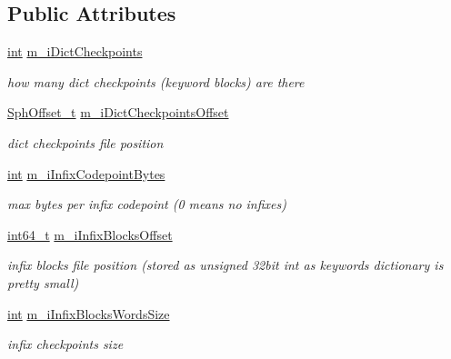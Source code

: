 \subsection*{Public Attributes}
\begin{DoxyCompactItemize}
\item 
\hyperlink{sphinxexpr_8cpp_a4a26e8f9cb8b736e0c4cbf4d16de985e}{int} \hyperlink{structDictHeader__t_affafa311bfd3aaf2dc4e458868faf186}{m\-\_\-i\-Dict\-Checkpoints}
\begin{DoxyCompactList}\small\item\em how many dict checkpoints (keyword blocks) are there \end{DoxyCompactList}\item 
\hyperlink{sphinx_8h_a0fb3b64afebef33c61367714754eaa90}{Sph\-Offset\-\_\-t} \hyperlink{structDictHeader__t_ae436099660493f3b1fbbb8b36af90c8d}{m\-\_\-i\-Dict\-Checkpoints\-Offset}
\begin{DoxyCompactList}\small\item\em dict checkpoints file position \end{DoxyCompactList}\item 
\hyperlink{sphinxexpr_8cpp_a4a26e8f9cb8b736e0c4cbf4d16de985e}{int} \hyperlink{structDictHeader__t_af40b69494a5b21f0bc19c2a81584fec8}{m\-\_\-i\-Infix\-Codepoint\-Bytes}
\begin{DoxyCompactList}\small\item\em max bytes per infix codepoint (0 means no infixes) \end{DoxyCompactList}\item 
\hyperlink{sphinxstd_8h_a996e72f71b11a5bb8b3b7b6936b1516d}{int64\-\_\-t} \hyperlink{structDictHeader__t_a0f7b83936bda4657de5c8076c3511e1a}{m\-\_\-i\-Infix\-Blocks\-Offset}
\begin{DoxyCompactList}\small\item\em infix blocks file position (stored as unsigned 32bit int as keywords dictionary is pretty small) \end{DoxyCompactList}\item 
\hyperlink{sphinxexpr_8cpp_a4a26e8f9cb8b736e0c4cbf4d16de985e}{int} \hyperlink{structDictHeader__t_a93fa9cfe2aba1ee6e0a05045b4276417}{m\-\_\-i\-Infix\-Blocks\-Words\-Size}
\begin{DoxyCompactList}\small\item\em infix checkpoints size \end{DoxyCompactList}\end{DoxyCompactItemize}


